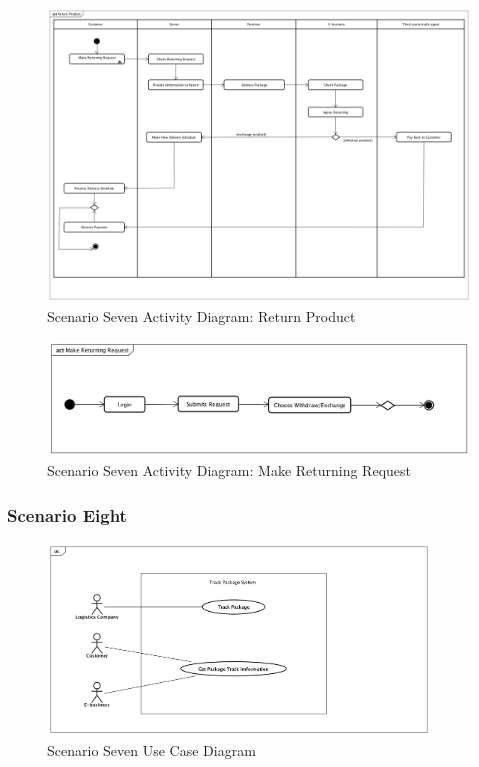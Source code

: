 \documentclass[12pt]{scrreprt}
\begin{document}
\begin{figure}[H]
  \centering\includegraphics[width=6in]{DocumentRes/7ReturnProduct.png}
  \caption{Scenario Seven Activity Diagram: Return Product}
\end{figure}

\begin{figure}[H]
  \centering\includegraphics[width=5in]{DocumentRes/7MakeReturningRequest.png}
  \caption{Scenario Seven Activity Diagram: Make Returning Request}
\end{figure}

\subsubsection{Scenario Eight}
\begin{figure}[H]
  \centering\includegraphics[width=4in]{DocumentRes/8UseCaseDiagram.png}
  \caption{Scenario Seven Use Case Diagram}
\end{figure}
\end{document}
